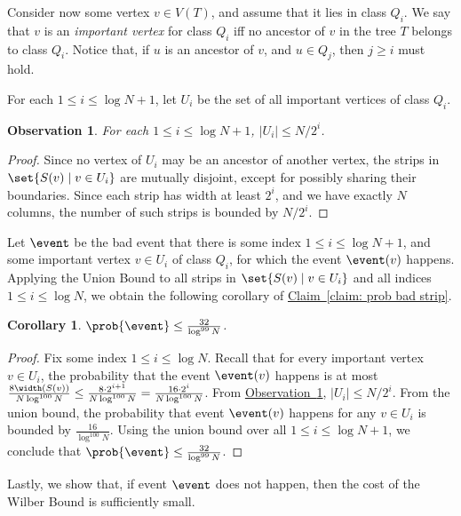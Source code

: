 \documentclass[11pt]{article}
\numberwithin{equation}{section}
\newtheorem{corollary}[theorem]{Corollary}
\theoremstyle{definition}
\theoremstyle{plain}
\newcommand{\expref}[2]{\hyperref[#2]{#1~\ref{#2}}}
\newtheorem{myobs}[theorem]{Observation}
\begin{document}
Consider now some vertex $v\in V(T)$, and assume that it lies in class $Q_i$. We say that $v$ is an \emph{important vertex} for class $Q_i$ iff no ancestor of $v$ in the tree $T$ belongs to class $Q_i$. Notice that, if $u$ is an ancestor of $v$, and $u\in Q_j$, then $j\geq i$ must hold.

For each $1\leq i\leq \log N+1$, let $U_i$ be the set of all important vertices of class $Q_i$. 

\begin{myobs}
\label{obs: bounded U_i} 
For each $1\leq i\leq \log N+1$, $|U_i| \leq N/2^i$. 
\end{myobs}
\begin{proof}
Since no vertex of $U_i$ may be an ancestor of another vertex, the strips in $\set{S(v)\mid v\in U_i}$ are mutually disjoint, except for possibly sharing their boundaries. 
Since each strip has width at least $2^i$, and we have exactly $N$ columns, the number of such strips is bounded by $N/2^i$. 
\end{proof}  



Let $\event$ be the bad event that there is some index $1\leq i\leq \log N+1$, and some important vertex $v\in U_i$ of class $Q_i$, for which  the event $\event(v)$ happens. 
Applying the Union Bound to all strips in $\set{S(v)\mid v\in U_i}$ and  all indices $1\leq i\leq \log N$, we obtain the following corollary of \expref{Claim}{claim: prob bad strip}.



\begin{corollary}\label{cor: no bad important strips}
	 $\prob{\event}\leq \frac{32}{\log^{99}N}$.
\end{corollary}
\begin{proof}
	Fix some index $1\leq i\leq \log N$. Recall that for every important vertex $v\in U_i$, the probability that the event $\event(v)$ happens is at most $\frac{8\width(S(v))}{N\log^{100} N}\leq \frac{8\cdot 2^{i+1}}{N\log^{100}N}=\frac{16\cdot 2^{i}}{N\log^{100}N}$. 
From \expref{Observation}{obs: bounded U_i}, $|U_i|\leq N/2^i$. 
From the union bound, the probability that event $\event(v)$ happens for any $v\in U_i$ is bounded by $\frac{16}{\log^{100}N}$. 
Using the union bound over all  $1\leq i\leq \log N+1$, we conclude that  $\prob{\event}\leq \frac{32}{\log^{99}N}$.
\end{proof}



Lastly, we show that, if event $\event$ does not happen, then the cost of the Wilber Bound is sufficiently small.
	
\end{document}
